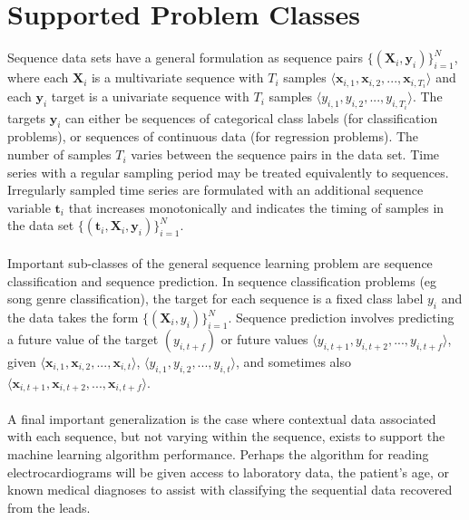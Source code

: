 \documentclass[twoside,11pt]{article}
\begin{document}
\section{Supported Problem Classes}

Sequence data sets have a general formulation \citep{dietterich_machine_2002} as sequence pairs $\{(\mathbf{X}_i,\mathbf{y}_i)\}_{i=1}^{N}$, where each $\mathbf{X}_i$ is a multivariate sequence with $T_i$ samples $\langle \mathbf{x}_{i,1}, \mathbf{x}_{i,2},...,\mathbf{x}_{i,T_i} \rangle$ and each $\mathbf{y}_i$ target is a univariate sequence with $T_i$ samples $ \langle y_{i,1}, y_{i,2},..., y_{i,T_i} \rangle $. The targets $\mathbf{y}_i$ can either be sequences of categorical class labels (for classification problems), or sequences of continuous data (for regression problems). The number of samples $T_i$ varies between the sequence pairs in the data set. Time series with a regular sampling period may be treated equivalently to sequences. Irregularly sampled time series are formulated with an additional sequence variable $\mathbf{t}_i$ that increases monotonically and indicates the timing of samples in the data set $\{(\mathbf{t}_i, \mathbf{X}_i,\mathbf{y}_i)\}_{i=1}^{N}$.  

\paragraph{}
Important sub-classes of the general sequence learning problem are sequence classification and sequence prediction. In sequence classification problems (eg song genre classification), the target for each sequence is a fixed class label $y_i$ and the data takes the form $\{(\mathbf{X}_i, y_i)\}_{i=1}^{N}$. Sequence prediction involves predicting a future value of the target $(y_{i,t+f})$ or future values $ \langle y_{i,t+1}, y_{i,t+2},..., y_{i,t+f} \rangle $, given
$\langle \mathbf{x}_{i,1}, \mathbf{x}_{i,2},...,\mathbf{x}_{i,t} \rangle$, $ \langle y_{i,1}, y_{i,2},..., y_{i,t} \rangle $, and sometimes also $\langle \mathbf{x}_{i,t+1}, \mathbf{x}_{i,t+2},...,\mathbf{x}_{i,t+f} \rangle$.

\paragraph{}
A final important generalization is the case where contextual data associated with each sequence, but not varying within the sequence, exists to support the machine learning algorithm performance. Perhaps the algorithm for reading electrocardiograms will be given access to laboratory data, the patient's age, or known medical diagnoses to assist with classifying the sequential data recovered from the leads. 
\end{document}
